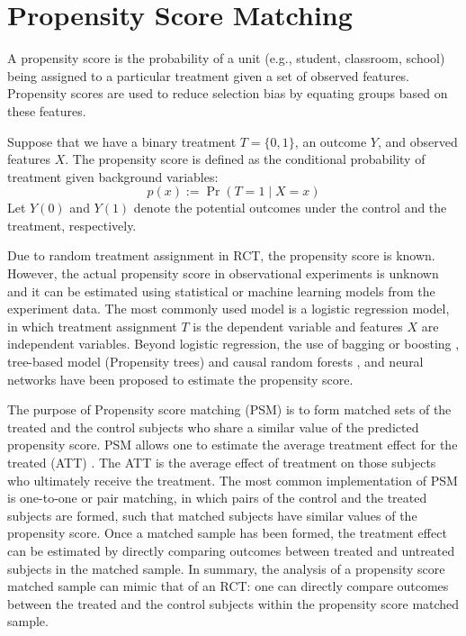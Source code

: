 \documentclass{article}
\begin{document}
\section{Propensity Score Matching}
A propensity score \cite{rosenbaum1983central} is the probability of a unit (e.g., student,
classroom, school) being assigned to a particular treatment given a
set of observed features. Propensity scores are used to reduce
selection bias by equating groups based on these features.

Suppose that we have a binary treatment $T=\{0,1\}$, an outcome $Y$, and
observed features $X$. The propensity score is defined as the
conditional probability of treatment given background variables:
$$p(x):= \Pr(T=1 \mid X=x)$$
Let $Y(0)$ and $Y(1)$ denote the potential outcomes under the control
and the treatment, respectively.

Due to random treatment assignment in RCT, the propensity score is
known. However, the actual propensity score in observational experiments is
unknown and it can be estimated using statistical or machine
learning models from the experiment data. The most commonly used model
is a logistic regression model, in which treatment assignment $T$ is
the dependent variable and features $X$ are independent variables. Beyond logistic regression, the
use of bagging or boosting \cite{Lee2010-zr}, tree-based model
(Propensity trees) and causal random forests
\cite{wager2015estimation}, and neural networks
\cite{setoguchi2008evaluating} have been proposed to estimate the
propensity score.

The purpose of Propensity score matching (PSM) \cite{austin2011introduction} is to form matched sets
of the treated and
the control subjects who share a similar value of the predicted propensity
score. PSM allows one to estimate the average treatment effect for the
treated (ATT) \cite{imbens2004nonparametric}. The ATT is the average effect of treatment on those
subjects who ultimately receive the treatment. The most common
implementation of PSM is one-to-one or pair matching, in which pairs
of the control and the treated subjects are formed, such that matched
subjects have similar values of the propensity score. Once a matched
sample has been formed, the treatment effect can be estimated by
directly comparing outcomes between treated and untreated subjects in
the matched sample. In summary, the analysis of a propensity score matched sample can mimic that of an
RCT: one can directly compare outcomes between the treated and the control
subjects within the propensity score matched sample. 
\end{document}
